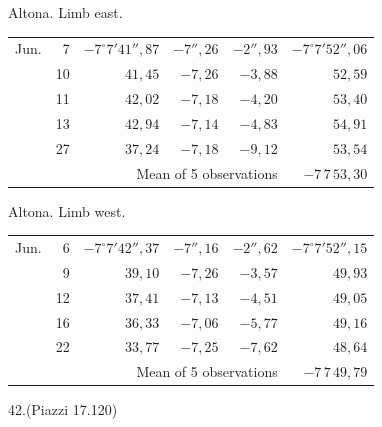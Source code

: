 \noindent\begin{minipage}[t]{.495\textwidth}\centering Altona. Limb east.\par\smallskip
{\scriptsize\setlength{\tabcolsep}{1pt}\renewcommand{\arraystretch}{1.2}\begin{tabular}{lr|r|r|r|r|}
Jun.&7&$-7^\circ7'41''{,}87$&$-7''{,}26$&$-2''{,}93$&$-7^\circ7'52''{,}06$\\
&10&$41{,}45$&$-7{,}26$&$-3{,}88$&$52{,}59$\\
&11&$42{,}02$&$-7{,}18$&$-4{,}20$&$53{,}40$\\
&13&$42{,}94$&$-7{,}14$&$-4{,}83$&$54{,}91$\\
&27&$37{,}24$&$-7{,}18$&$-9{,}12$&$53{,}54$\\
\cline{6-6}\multicolumn{5}{r}{Mean of 5 observations}&$-7\,7\,53{,}30$
\end{tabular}}\end{minipage}\hfill\begin{minipage}[t]{.495\textwidth}\centering Altona. Limb west.\par\smallskip
{\scriptsize\setlength{\tabcolsep}{1pt}\renewcommand{\arraystretch}{1.2}\begin{tabular}{lr|r|r|r|r}
Jun.&6&$-7^\circ7'42''{,}37$&$-7''{,}16$&$-2''{,}62$&$-7^\circ7'52''{,}15$\\
&9&$39{,}10$&$-7{,}26$&$-3{,}57$&$49{,}93$\\
&12&$37{,}41$&$-7{,}13$&$-4{,}51$&$49{,}05$\\
&16&$36{,}33$&$-7{,}06$&$-5{,}77$&$49{,}16$\\
&22&$33{,}77$&$-7{,}25$&$-7{,}62$&$48{,}64$\\
\cline{6-6}\multicolumn{5}{r}{Mean of 5 observations}&$-7\,7\,49{,}79$
\end{tabular}}\end{minipage}
\par\vspace{4mm}
\begin{center}42.\quad (Piazzi 17.120)\end{center}

